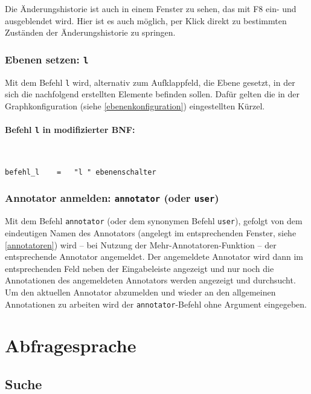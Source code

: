 \documentclass[12pt]{scrartcl}
\begin{document}
Die Änderungshistorie ist auch in einem Fenster zu sehen, das mit F8 ein- und ausgeblendet wird.
Hier ist es auch möglich, per Klick direkt zu bestimmten Zuständen der Änderungshistorie zu springen.


\subsubsection{Ebenen setzen: \texttt{l}}\label{befehl-l}

Mit dem Befehl \texttt{l} wird, alternativ zum Aufklappfeld, die Ebene gesetzt, in der sich die nachfolgend erstellten Elemente befinden sollen. Dafür gelten die in der Graphkonfiguration (siehe \ref{ebenenkonfiguration}) eingestellten Kürzel.

\paragraph*{Befehl \texttt{l} in modifizierter BNF:}
~
\begin{framed}
\begin{lstlisting}
befehl_l    =   "l " ebenenschalter
\end{lstlisting}
\end{framed}


\subsubsection{Annotator anmelden: \texttt{annotator} (oder \texttt{user})}

Mit dem Befehl \texttt{annotator} (oder dem synonymen Befehl \texttt{user}), gefolgt von dem eindeutigen Namen des Annotators (angelegt im entsprechenden Fenster, siehe \ref{annotatoren}) wird – bei Nutzung der Mehr-Annotatoren-Funktion – der entsprechende Annotator angemeldet.
Der angemeldete Annotator wird dann im entsprechenden Feld neben der Eingabeleiste angezeigt und nur noch die Annotationen des angemeldeten Annotators werden angezeigt und durchsucht.
Um den aktuellen Annotator abzumelden und wieder an den allgemeinen Annotationen zu arbeiten wird der \texttt{annotator}-Befehl ohne Argument eingegeben.






\section{Abfragesprache}

\subsection{Suche}
\end{document}
